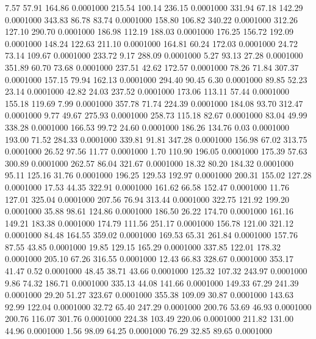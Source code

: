    7.57   57.91  164.86   0.0001000
 215.54  100.14  236.15   0.0001000
 331.94   67.18  142.29   0.0001000
 343.83   86.78   83.74   0.0001000
 158.80  106.82  340.22   0.0001000
 312.26  127.10  290.70   0.0001000
 186.98  112.19  188.03   0.0001000
 176.25  156.72  192.09   0.0001000
 148.24  122.63  211.10   0.0001000
 164.81   60.24  172.03   0.0001000
  24.72   73.14  109.67   0.0001000
 233.72    9.17  288.09   0.0001000
   5.27   93.13   27.28   0.0001000
 351.89   60.70   73.68   0.0001000
 237.51   42.62  172.57   0.0001000
  78.26   71.84  307.37   0.0001000
 157.15   79.94  162.13   0.0001000
 294.40   90.45    6.30   0.0001000
  89.85   52.23   23.14   0.0001000
  42.82   24.03  237.52   0.0001000
 173.06  113.11   57.44   0.0001000
 155.18  119.69    7.99   0.0001000
 357.78   71.74  224.39   0.0001000
 184.08   93.70  312.47   0.0001000
   9.77   49.67  275.93   0.0001000
 258.73  115.18   82.67   0.0001000
  83.04   49.99  338.28   0.0001000
 166.53   99.72   24.60   0.0001000
 186.26  134.76    0.03   0.0001000
 193.00   71.52  284.33   0.0001000
 339.81   91.81  347.28   0.0001000
 156.98   67.02  313.75   0.0001000
  26.52   97.56   11.77   0.0001000
   1.70  110.90  196.05   0.0001000
 175.39   57.63  300.89   0.0001000
 262.57   86.04  321.67   0.0001000
  18.32   80.20  184.32   0.0001000
  95.11  125.16   31.76   0.0001000
 196.25  129.53  192.97   0.0001000
 200.31  155.02  127.28   0.0001000
  17.53   44.35  322.91   0.0001000
 161.62   66.58  152.47   0.0001000
  11.76  127.01  325.04   0.0001000
 207.56   76.94  313.44   0.0001000
 322.75  121.92  199.20   0.0001000
  35.88   98.61  124.86   0.0001000
 186.50   26.22  174.70   0.0001000
 161.16  149.21  183.38   0.0001000
 174.79  111.56  251.17   0.0001000
 156.78  121.00  321.12   0.0001000
  84.48  164.55  359.02   0.0001000
 169.53   65.31  261.84   0.0001000
 157.76   87.55   43.85   0.0001000
  19.85  129.15  165.29   0.0001000
 337.85  122.01  178.32   0.0001000
 205.10   67.26  316.55   0.0001000
  12.43   66.83  328.67   0.0001000
 353.17   41.47    0.52   0.0001000
  48.45   38.71   43.66   0.0001000
 125.32  107.32  243.97   0.0001000
   9.86   74.32  186.71   0.0001000
 335.13   44.08  141.66   0.0001000
 149.33   67.29  241.39   0.0001000
  29.20   51.27  323.67   0.0001000
 355.38  109.09   30.87   0.0001000
 143.63   92.99  122.04   0.0001000
  32.72   65.40  247.29   0.0001000
 200.76   53.69   46.93   0.0001000
 200.76  116.07  301.76   0.0001000
 224.38  103.49  220.06   0.0001000
 211.82  131.00   44.96   0.0001000
   1.56   98.09   64.25   0.0001000
  76.29   32.85   89.65   0.0001000
